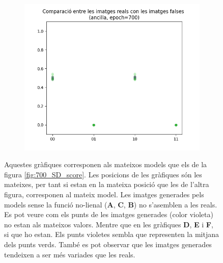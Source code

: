 \begin{figure}
\begin{subfigure}[b]{.32\linewidth}
		\includegraphics[width=\linewidth]{figures/data/scatter_plot_A6.png}
		\caption{}
	\end{subfigure}
	\label{fig:700_images}
	\caption{Aquestes gràfiques corresponen als mateixos models que els de la figura \ref{fig:700_SD_score}. Les posicions de les gràfiques són les mateixes, per tant si estan en la mateixa posició que les de l'altra figura, corresponen al mateix model. Les imatges generades pels models sense la funció no-lienal  (\textbf{A}, \textbf{C}, \textbf{B}) no s'asemblen a les reals. Es pot veure com els punts de les imatges generades (color violeta) no estan als mateixos valors. Mentre que en les gràfiques \textbf{D}, \textbf{E} i \textbf{F}, si que ho estan. Els punts violetes sembla que representen la mitjana dels punts verds. També es pot observar que les imatges generades tendeixen a ser més variades que les reals.}
	
\end{figure}




